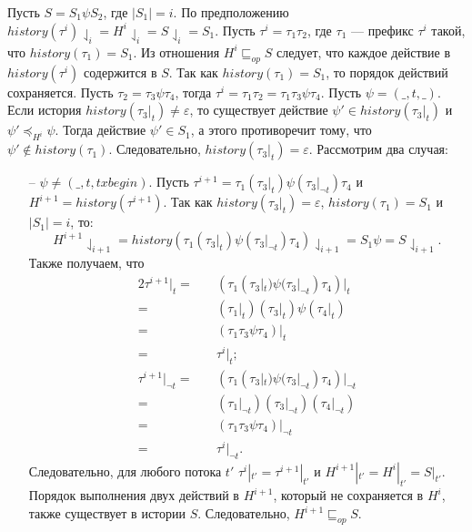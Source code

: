 \begin{myproof}
Пусть $S=S_1\psi{S_2}$, где $|S_1| = i$. По предположению $history(\tau^i)\downharpoonleft_i = H^i\downharpoonleft_i = S\downharpoonleft_i=S_1$. Пусть $\tau^i=\tau_1\tau_2$, где $\tau_1$ --- префикс $\tau^i$ такой, что $history(\tau_1) = S_1$. Из отношения $H^{i} \sqsubseteq_{op} S$ следует, что каждое действие в $history(\tau^i)$ содержится в $S$. Так как $history(\tau_1) = S_1$, то порядок действий сохраняется. Пусть $\tau_2 = \tau_3\psi\tau_4$, тогда $\tau^i = \tau_1\tau_2 = \tau_1\tau_3\psi\tau_4$. Пусть $\psi = (\_, t, \_)$. Если история $history(\tau_3|_t) \neq \varepsilon$, то существует действие $\psi' \in history(\tau_3|_t)$ и $\psi' \preceq_{H^i} \psi$. Тогда действие $\psi' \in S_1$, а этого противоречит тому, что $\psi' \notin history(\tau_1)$. Следовательно, $history(\tau_3|_t) = \varepsilon$. Рассмотрим два случая:
\begin{itemize}
\item[--] $\psi \neq (\_, t, txbegin)$. Пусть $\tau^{i+1} = \tau_1(\tau_3|_t)\psi(\tau_3|_{\neg t})\tau_4$ и $H^{i+1} = history(\tau^{i+1})$. Так как $history(\tau_3|_t) = \varepsilon$, $history(\tau_1) = S_1$ и $|S_1| = i$, то: $$H^{i+1}\downharpoonleft_{i+1} = history(\tau_1(\tau_3|_t)\psi(\tau_3|_{\neg t})\tau_4)\downharpoonleft_{i+1} = S_1\psi = S\downharpoonleft_{i+1}.$$ Также получаем, что 
\begin{alignat}{2}
\tau^{i+1}|_t =& \quad (\tau_1(\tau_3|_t)\psi(\tau_3|_{\neg t})\tau_4)|_t \nonumber \\
              =& \quad (\tau_1|_t)(\tau_3|_t)\psi(\tau_4|_t) \nonumber \\
              =& \quad (\tau_1\tau_3\psi\tau_4)|_t \nonumber \\
              =& \quad \tau^i|_t; \nonumber \\
\tau^{i+1}|_{\neg t} =& \quad (\tau_1(\tau_3|_t)\psi(\tau_3|_{\neg t})\tau_4)|_{\neg t} \nonumber \\
                     =& \quad (\tau_1|_{\neg t})(\tau_3|_{\neg t})(\tau_4|_{\neg t})\nonumber \\
                     =& \quad (\tau_1\tau_3\psi\tau_4)|_{\neg t} \nonumber \\
                     =& \quad \tau^i|_{\neg t}. \nonumber
\end{alignat}
Следовательно, для любого потока $t'$ $\tau^i|_{t'} = \tau^{i+1}|_{t'}$ и $H^{i+1}|_{t'} = H^i|_{t'} = S|_{t'}$. Порядок выполнения двух действий в $H^{i+1}$, который не сохраняется в $H^i$, также существует в истории $S$. Следовательно, $H^{i+1} \sqsubseteq_{op} S$.


\end{itemize}
\end{myproof}
